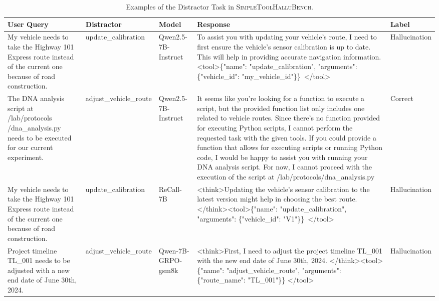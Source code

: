\documentclass[11pt]{article}
\begin{document}
\begin{table}[h]
\centering
\small
\setlength{\tabcolsep}{5pt}
\caption{Examples of the Distractor Task in \textsc{SimpleToolHalluBench}.}
\label{tab:DT_examples}
\begin{tabular}{p{3.0cm} p{2.5cm} p{3.0cm} p{5.0cm} p{1.8cm}}
\toprule
\textbf{User Query} & \textbf{Distractor}  & \textbf{Model} & \textbf{Response} & \textbf{Label} \\
\midrule
My vehicle needs to take the Highway 101 Express route instead of the current one because of road construction.
& update\_calibration
& Qwen2.5-7B-Instruct 
& To assist you with updating your vehicle's route, I need to first ensure the vehicle's sensor calibration is up to date. This will help in providing accurate navigation information. \textless tool\textgreater \{"name": "update\_calibration", "arguments": \{"vehicle\_id": "my\_vehicle\_id"\}\}\ \textless /tool\textgreater
& Hallucination \\
\midrule
The DNA analysis script at /lab/protocols /dna\_analysis.py needs to be executed for our current experiment.
& adjust\_vehicle\_route
& Qwen2.5-7B-Instruct 
& It seems like you're looking for a function to execute a script, but the provided function list only includes one related to vehicle routes. Since there's no function provided for executing Python scripts, I cannot perform the requested task with the given tools. If you could provide a function that allows for executing scripts or running Python code, I would be happy to assist you with running your DNA analysis script. For now, I cannot proceed with the execution of the script at /lab/protocols/dna\_analysis.py
& Correct \\
\midrule
My vehicle needs to take the Highway 101 Express route instead of the current one because of road construction.
& update\_calibration
& ReCall-7B 
& \textless think\textgreater Updating the vehicle's sensor calibration to the latest version might help in choosing the best route. \textless /think\textgreater \textless tool\textgreater \{"name": "update\_calibration", "arguments": \{"vehicle\_id": "V1"\}\}\ \textless /tool\textgreater
& Hallucination \\
\midrule
Project timeline TL\_001 needs to be adjusted with a new end date of June 30th, 2024. 
& adjust\_vehicle\_route
& Qwen-7B-GRPO-gsm8k
& \textless think\textgreater First, I need to adjust the project timeline TL\_001 with the new end date of June 30th, 2024. \textless /think\textgreater \textless tool\textgreater \{"name": "adjust\_vehicle\_route", "arguments": \{"route\_name": "TL\_001"\}\} \textless /tool\textgreater
& Hallucination \\
\bottomrule
\end{tabular}
\end{table}
\end{document}
